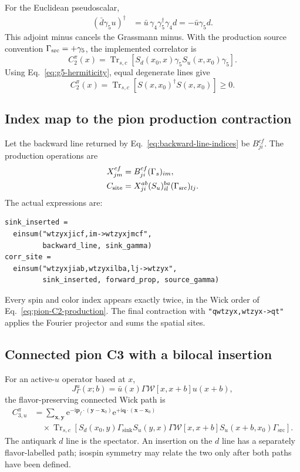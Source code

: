 \documentclass[11pt,a4paper]{article}
\numberwithin{equation}{section}
\newcommand{\ii}{\mathrm{i}}
\newcommand{\ee}{\mathrm{e}}
\newcommand{\Trsc}{\operatorname{Tr}_{s,c}}
\newcommand{\cW}{\mathcal{W}}
\newcommand{\Gsrc}{\Gamma_{\mathrm{src}}}
\newcommand{\Gsink}{\Gamma_{\mathrm{sink}}}
\newcommand{\code}[1]{%
  \ifmmode\text{\texttt{\detokenize{#1}}}\else\nolinkurl{#1}\fi}
\begin{document}
For the Euclidean pseudoscalar,
\begin{align}
 (\bar d\gamma_5u)^\dagger
 &=\bar u\,\gamma_4\gamma_5^\dagger\gamma_4d
 =-\bar u\gamma_5d.
\end{align}
This adjoint minus cancels the Grassmann minus.  With the production source
convention \(\Gamma_{\rm src}=+\gamma_5\), the implemented correlator is
\begin{equation}
 C_2^\pi(x)
 =\Trsc\left[
 S_d(x_0,x)\gamma_5S_u(x,x_0)\gamma_5
 \right].
 \label{eq:pion-C2-production}
\end{equation}
Using Eq.~\eqref{eq:g5-hermiticity}, equal degenerate lines give
\begin{equation}
 C_2^\pi(x)
 =\Trsc[S(x,x_0)^\dagger S(x,x_0)]\geq0.
 \label{eq:pion-positive-norm}
\end{equation}

\subsection{Index map to the pion production contraction}

Let the backward line returned by Eq.~\eqref{eq:backward-line-indices} be
\(B_{ji}^{cf}\).  The production operations are
\begin{align}
 X_{jm}^{cf}
 &=B_{ji}^{cf}(\Gamma_s)_{im},\\
 C_{\rm site}
 &=X_{ji}^{ab}
   (S_u)_{il}^{ba}
   (\Gamma_{\rm src})_{lj}.
\end{align}
The actual expressions are:
\begin{lstlisting}
sink_inserted =
  einsum("wtzyxjicf,im->wtzyxjmcf",
         backward_line, sink_gamma)
corr_site =
  einsum("wtzyxjiab,wtzyxilba,lj->wtzyx",
         sink_inserted, forward_prop, source_gamma)
\end{lstlisting}
Every spin and color index appears exactly twice, in the Wick order of
Eq.~\eqref{eq:pion-C2-production}.  The final contraction with
\code{"qwtzyx,wtzyx->qt"} applies the Fourier projector and sums the spatial
sites.

\subsection{Connected pion C3 with a bilocal insertion}

For an active-\(u\) operator based at \(x\),
\begin{equation}
 J_\Gamma^u(x;b)
 =\bar u(x)\Gamma\cW[x,x+b]u(x+b),
 \label{eq:pion-bilocal}
\end{equation}
the flavor-preserving connected Wick path is
\begin{align}
 C_{3,u}^\pi
 &=\sum_{\boldsymbol x,\boldsymbol y}
 \ee^{-\ii\boldsymbol p_f\cdot(\boldsymbol y-\boldsymbol x_0)}
 \ee^{+\ii\boldsymbol q\cdot(\boldsymbol x-\boldsymbol x_0)}
 \nonumber\\
 &\quad\times\Trsc\left[
 S_d(x_0,y)\Gsink
 S_u(y,x)\Gamma
 \cW[x,x+b]S_u(x+b,x_0)\Gsrc
 \right].
 \label{eq:pion-C3-master}
\end{align}
The antiquark \(d\) line is the spectator.  An insertion on the \(d\) line
has a separately flavor-labelled path; isospin symmetry may relate the two
only after both paths have been defined.
\end{document}
